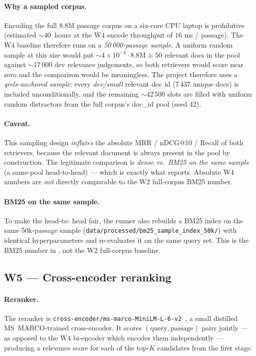 \documentclass[11pt,a4paper]{article}
\makeatletter
\newcommand{\devsmall}{\textit{dev/small}}
\newcommand{\msmarco}{MS~MARCO}
\newcommand{\ndcg}{nDCG@10}
\newcommand{\bmtwofive}{BM25}
\makeatother
\begin{document}
\paragraph{Why a sampled corpus.}
\label{sec:w4-sampling-caveat}
Encoding the full 8.8M passage corpus on a six-core CPU laptop is
prohibitive (estimated $\sim\!40$~hours at the W4 encode throughput
of $16$ ms / passage).  The W4 baseline therefore runs on a
\emph{50\,000-passage sample}.  A uniform random sample at this size
would put $\sim\!4\!\times\!10^{-4}\!\cdot\!8.8\textrm{M}\!\approx\!50$
relevant docs in the pool against $\sim\!17\,000$ dev relevance
judgements, so both retrievers would score near zero and the
comparison would be meaningless.  The project therefore uses a
\emph{qrels-anchored sample}: every \devsmall{} relevant doc id
(7\,437 unique docs) is included unconditionally, and the remaining
$\sim\!42\,500$ slots are filled with uniform random distractors
from the full corpus's doc\_id pool (seed 42).

\paragraph{Caveat.}  This sampling design \emph{inflates} the
absolute MRR / \ndcg{} / Recall of both retrievers, because the
relevant document is always present in the pool by construction.
The legitimate comparison is \emph{dense vs.\ \bmtwofive{} on the
same sample} (a same-pool head-to-head) --- which is exactly what
 reports.  Absolute W4 numbers are \emph{not}
directly comparable to the W2 full-corpus \bmtwofive{} number.

\paragraph{\bmtwofive{} on the same sample.}  To make the head-to-
head fair, the runner also rebuilds a \bmtwofive{} index on the same
50k-passage sample (\texttt{data/processed/bm25\_sample\_index\_50k/})
with identical hyperparameters and re-evaluates it on the same query
set.  This is the \bmtwofive{} number in , not
the W2 full-corpus baseline.

\subsection{W5 --- Cross-encoder reranking}
\label{sec:w5}

\paragraph{Reranker.}  The reranker is
\texttt{cross-encoder/ms-marco-MiniLM-L-6-v2}~\cite{nogueira2019passage,wang2020minilm},
a small distilled \msmarco{}-trained cross-encoder.  It scores
$(\text{query}, \text{passage})$ pairs jointly --- as opposed to the
W4 bi-encoder which encodes them independently --- producing a
relevance score for each of the top-$K$ candidates from the first
stage.
\end{document}
